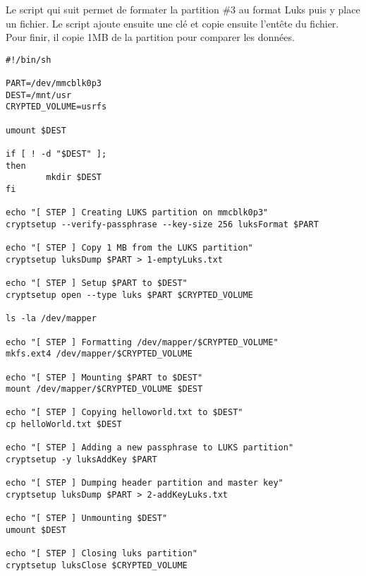 Le script qui suit permet de formater la partition \#3 au format Luks puis y place un fichier. Le script ajoute ensuite une clé et copie ensuite l'entête du fichier. Pour finir, il copie 1MB de la partition pour comparer les données.
\begin{lstlisting}[style=Bash]
#!/bin/sh

PART=/dev/mmcblk0p3
DEST=/mnt/usr
CRYPTED_VOLUME=usrfs

umount $DEST

if [ ! -d "$DEST" ];
then
        mkdir $DEST
fi

echo "[ STEP ] Creating LUKS partition on mmcblk0p3"
cryptsetup --verify-passphrase --key-size 256 luksFormat $PART

echo "[ STEP ] Copy 1 MB from the LUKS partition"   
cryptsetup luksDump $PART > 1-emptyLuks.txt

echo "[ STEP ] Setup $PART to $DEST"
cryptsetup open --type luks $PART $CRYPTED_VOLUME

ls -la /dev/mapper

echo "[ STEP ] Formatting /dev/mapper/$CRYPTED_VOLUME"
mkfs.ext4 /dev/mapper/$CRYPTED_VOLUME

echo "[ STEP ] Mounting $PART to $DEST"
mount /dev/mapper/$CRYPTED_VOLUME $DEST

echo "[ STEP ] Copying helloworld.txt to $DEST"
cp helloWorld.txt $DEST

echo "[ STEP ] Adding a new passphrase to LUKS partition"
cryptsetup -y luksAddKey $PART

echo "[ STEP ] Dumping header partition and master key"
cryptsetup luksDump $PART > 2-addKeyLuks.txt

echo "[ STEP ] Unmounting $DEST"                      
umount $DEST

echo "[ STEP ] Closing luks partition"                   
cryptsetup luksClose $CRYPTED_VOLUME
\end{lstlisting}


